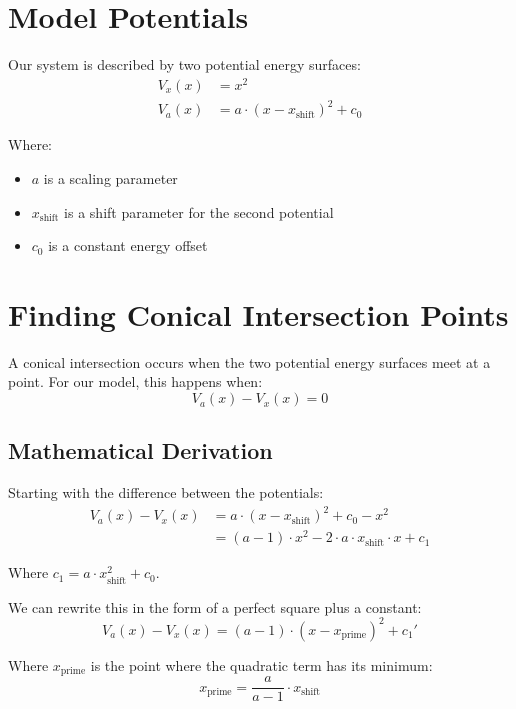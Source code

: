 \documentclass{article}
\begin{document}
\section{Model Potentials}

Our system is described by two potential energy surfaces:
\begin{align}
V_x(x) &= x^2 \\
V_a(x) &= a \cdot (x - x_{\text{shift}})^2 + c_0
\end{align}

Where:
\begin{itemize}
    \item $a$ is a scaling parameter
    \item $x_{\text{shift}}$ is a shift parameter for the second potential
    \item $c_0$ is a constant energy offset
\end{itemize}

\section{Finding Conical Intersection Points}

A conical intersection occurs when the two potential energy surfaces meet at a point. For our model, this happens when:
\begin{equation}
V_a(x) - V_x(x) = 0
\end{equation}

\subsection{Mathematical Derivation}

Starting with the difference between the potentials:
\begin{align}
V_a(x) - V_x(x) &= a \cdot (x - x_{\text{shift}})^2 + c_0 - x^2 \\
&= (a - 1) \cdot x^2 - 2 \cdot a \cdot x_{\text{shift}} \cdot x + c_1
\end{align}

Where $c_1 = a \cdot x_{\text{shift}}^2 + c_0$.

We can rewrite this in the form of a perfect square plus a constant:
\begin{equation}
V_a(x) - V_x(x) = (a - 1) \cdot (x - x_{\text{prime}})^2 + c_1'
\end{equation}

Where $x_{\text{prime}}$ is the point where the quadratic term has its minimum:
\begin{equation}
x_{\text{prime}} = \frac{a}{a - 1} \cdot x_{\text{shift}}
\end{equation}
\end{document}
